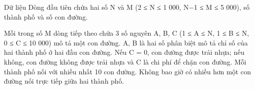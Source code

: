 Dữ liệu  
Dòng đầu tiên chứa hai số N và M (2 ≤ N ≤ 1 000, N−1 ≤ M ≤ 5 000), số thành phố và số con đường.  

   Mỗi trong số M dòng tiếp theo chứa 3 số nguyên A, B, C (1 ≤ A ≤ N, 1 ≤ B ≤ N, 0 ≤ C ≤ 10 000) mô tả một con đường. A, B là hai số phân biệt mô tả chỉ số của hai thành phố ở hai đầu con đường. Nếu C = 0, con đường được trải nhựa; nếu không, con đường không được trải nhựa và C là chi phí để chặn con đường. Mỗi thành phố nối với nhiều nhất 10 con đường. Không bao giờ có nhiều hơn một con đường nối trực tiếp giữa hai thành phố.